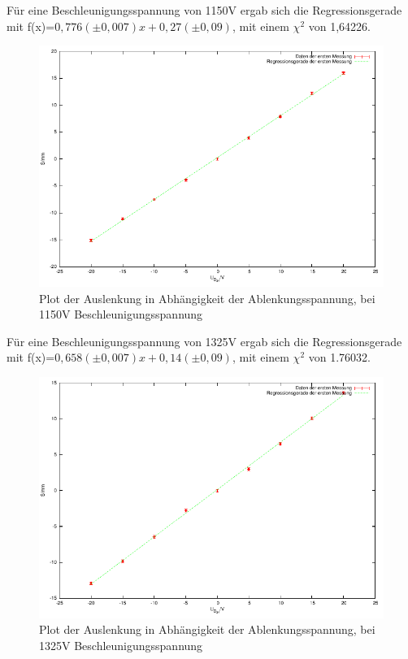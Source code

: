 \documentclass[12pt]{scrartcl}
\begin{document}
\newpage

Für eine Beschleunigungsspannung von 1150V ergab sich die Regressionsgerade mit f(x)=$0,776 (\pm 0,007) x  + 0,27 (\pm 0,09)$, mit einem $\chi^2$ von 1,64226.

\begin{figure}[htbp] 
  \centering
    \includegraphics[scale = 1]{y_2.pdf}
  	\caption[Plot der Auslenkung in Abhängigkeit der Ablenkungsspannung, bei 1150V Beschleunigungsspannung]{Plot der Auslenkung in Abhängigkeit der Ablenkungsspannung, bei 1150V Beschleunigungsspannung}
  \label{fig:x_1}
\end{figure}


\newpage

Für eine Beschleunigungsspannung von 1325V ergab sich die Regressionsgerade mit f(x)=$0,658 (\pm 0,007) x  +0,14 (\pm 0,09)$, mit einem $\chi^2$ von 1.76032.

\begin{figure}[htbp] 
  \centering
    \includegraphics[scale = 1]{y_3.pdf}
  	\caption[Plot der Auslenkung in Abhängigkeit der Ablenkungsspannung, bei 1325V Beschleunigungsspannung]{Plot der Auslenkung in Abhängigkeit der Ablenkungsspannung, bei 1325V Beschleunigungsspannung}
  \label{fig:x_1}
\end{figure}
\end{document}
